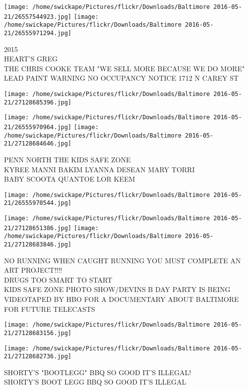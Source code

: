 \documentclass[10pt,letterpaper]{article}
\begin{document}
\texttt{[image: /home/swickape/Pictures/flickr/Downloads/Baltimore 2016-05-21/26557544923.jpg]}
\texttt{[image: /home/swickape/Pictures/flickr/Downloads/Baltimore 2016-05-21/26555971294.jpg]}

2015\\
HEART'S GREG\\
THE CHRIS COOKE TEAM "WE SELL MORE BECAUSE WE DO MORE"\\
LEAD PAINT WARNING NO OCCUPANCY NOTICE 1712 N CAREY ST
\pagebreak

\texttt{[image: /home/swickape/Pictures/flickr/Downloads/Baltimore 2016-05-21/27128685396.jpg]}

\vspace{0.25in}
\texttt{[image: /home/swickape/Pictures/flickr/Downloads/Baltimore 2016-05-21/26555970964.jpg]}
\texttt{[image: /home/swickape/Pictures/flickr/Downloads/Baltimore 2016-05-21/27128684646.jpg]}

PENN NORTH THE KIDS SAFE ZONE\\
KYREE MANNI BAKIM LYANNA DESEAN MARY TORRI\\
BABY SCOOTA QUANTOE LOR KEEM
\pagebreak

\texttt{[image: /home/swickape/Pictures/flickr/Downloads/Baltimore 2016-05-21/26555970544.jpg]}

\vspace{0.25in}
\texttt{[image: /home/swickape/Pictures/flickr/Downloads/Baltimore 2016-05-21/27128651386.jpg]}
\texttt{[image: /home/swickape/Pictures/flickr/Downloads/Baltimore 2016-05-21/27128683846.jpg]}

NO RUNNING WHEN CAUGHT RUNNING YOU MUST COMPLETE AN ART PROJECT!!!!\\
DRUGS TOO SMART TO START\\
KIDS SAFE ZONE PHOTO SHOW/DEVINS B DAY PARTY IS BEING VIDEOTAPED BY HBO FOR A DOCUMENTARY ABOUT BALTIMORE FOR FUTURE TELECASTS
\pagebreak

\texttt{[image: /home/swickape/Pictures/flickr/Downloads/Baltimore 2016-05-21/27128683156.jpg]}

\vspace{0.25in}
\texttt{[image: /home/swickape/Pictures/flickr/Downloads/Baltimore 2016-05-21/27128682736.jpg]}

SHORTY'S "BOOTLEGG" BBQ SO GOOD IT'S ILLEGAL!\\
SHORTY'S BOOT LEGG BBQ SO GOOD IT'S ILLEGAL
\pagebreak
\end{document}
